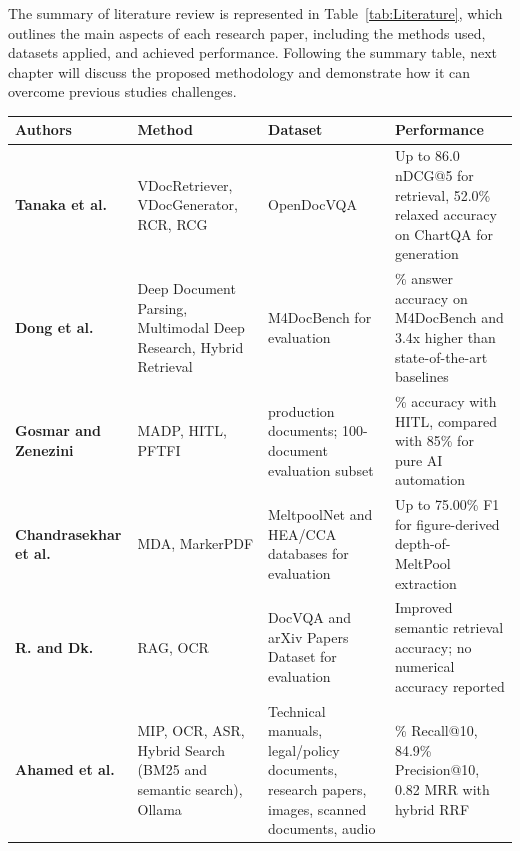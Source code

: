 \documentclass[11pt,a4paper]{report}
\begin{document}
The summary of literature review is represented in Table~\ref{tab:Literature}, which outlines the main aspects of each research paper, including the methods used, datasets applied, and achieved performance. Following the summary table, next chapter will discuss the proposed methodology and demonstrate how it can overcome previous studies challenges.

\begin{table}[h]
    \centering
    \begin{tabular}{|>{\raggedright\arraybackslash}p{}|>{\raggedright\arraybackslash}p{}|>{\raggedright\arraybackslash}p{}|>{\raggedright\arraybackslash}p{}|}
        \hline
        \textbf{Authors} & \textbf{Method} & \textbf{Dataset} & \textbf{Performance} \\
        \hline
        \textbf{Tanaka et al.} &
        VDocRetriever, VDocGenerator, \ac{RCR}, \ac{RCG} &
        OpenDocVQA &
        Up to 86.0 \ac{nDCG@5} for retrieval, 52.0\% relaxed accuracy on ChartQA for generation \\
        \hline
        \textbf{Dong et al.} &
        Deep Document Parsing, Multimodal Deep Research, Hybrid Retrieval &
        M4DocBench for evaluation &
        50.6\% answer accuracy on M4DocBench and 3.4x higher than state-of-the-art baselines \\
        \hline
        \textbf{Gosmar and Zenezini} &
        MADP, \ac{HITL}, \ac{PFTFI} &
        955 production documents; 100-document evaluation subset &
        98.5\% accuracy with \ac{HITL}, compared with 85\% for pure \ac{AI} automation \\
        \hline
        \textbf{Chandrasekhar et al.} &
        \ac{MDA}, MarkerPDF &
        MeltpoolNet and \ac{HEA}/\ac{CCA} databases for evaluation &
        Up to 75.00\% F1 for figure-derived depth-of-MeltPool extraction \\
        \hline
        \textbf{R. and Dk.} &
        \ac{RAG}, \ac{OCR} &
        DocVQA and arXiv Papers Dataset for evaluation &
        Improved semantic retrieval accuracy; no numerical accuracy reported \\
        \hline
        \textbf{Ahamed et al.} &
        \ac{MIP}, \ac{OCR}, \ac{ASR}, Hybrid Search (\ac{BM25} and semantic search), Ollama &
        Technical manuals, legal/policy documents, research papers, images, scanned documents, audio &
        87.4\% Recall@10, 84.9\% Precision@10, 0.82 MRR with hybrid \ac{RRF} \\
        \hline

\end{tabular}
\end{table}
\end{document}
